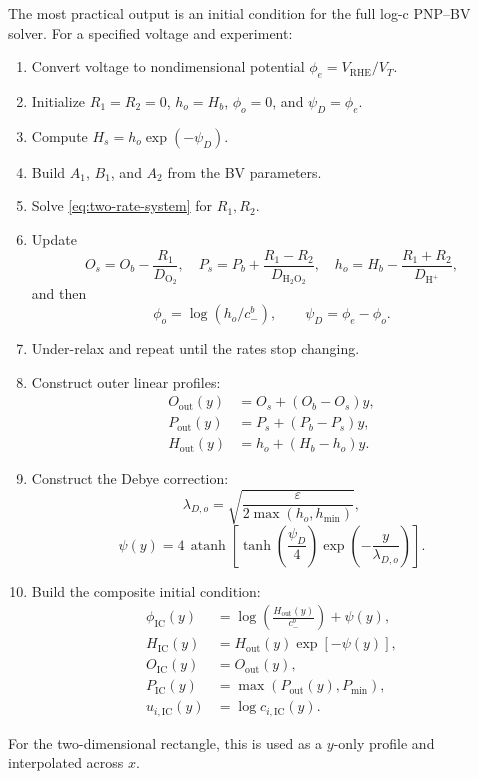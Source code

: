 \documentclass[11pt]{article}
\newcommand{\OO}{\mathrm{O}_2}
\newcommand{\PP}{\mathrm{H}_2\mathrm{O}_2}
\newcommand{\HH}{\mathrm{H}^{+}}
\newcommand{\VT}{V_T}
\newcommand{\epshat}{\varepsilon}
\begin{document}
The most practical output is an initial condition for the full log-c PNP--BV
solver. For a specified voltage and experiment:
\begin{enumerate}
  \item Convert voltage to nondimensional potential
        \(\phi_e=V_{\mathrm{RHE}}/\VT\).
  \item Initialize \(R_1=R_2=0\), \(h_o=H_b\), \(\phi_o=0\), and
        \(\psi_D=\phi_e\).
  \item Compute \(H_s=h_o\exp(-\psi_D)\).
  \item Build \(A_1\), \(B_1\), and \(A_2\) from the BV parameters.
  \item Solve \eqref{eq:two-rate-system} for \(R_1,R_2\).
  \item Update
        \[
          O_s=O_b-\frac{R_1}{D_{\OO}},
          \quad
          P_s=P_b+\frac{R_1-R_2}{D_{\PP}},
          \quad
          h_o=H_b-\frac{R_1+R_2}{D_{\HH}},
        \]
        and then
        \[
          \phi_o=\log(h_o/c_-^b),
          \qquad
          \psi_D=\phi_e-\phi_o.
        \]
  \item Under-relax and repeat until the rates stop changing.
  \item Construct outer linear profiles:
        \begin{align}
          O_{\mathrm{out}}(y) &= O_s+(O_b-O_s)y, \\
          P_{\mathrm{out}}(y) &= P_s+(P_b-P_s)y, \\
          H_{\mathrm{out}}(y) &= h_o+(H_b-h_o)y.
        \end{align}
  \item Construct the Debye correction:
        \[
          \lambda_{D,o}=\sqrt{\frac{\epshat}{2\max(h_o,h_{\min})}},
        \]
        \[
          \psi(y)
          =
          4\,\operatorname{atanh}
          \left[
            \tanh\!\left(\frac{\psi_D}{4}\right)
            \exp\!\left(-\frac{y}{\lambda_{D,o}}\right)
          \right].
        \]
  \item Build the composite initial condition:
        \begin{align}
          \phi_{\mathrm{IC}}(y)
          &=
          \log\!\left(\frac{H_{\mathrm{out}}(y)}{c_-^b}\right)
          + \psi(y), \\
          H_{\mathrm{IC}}(y)
          &=
          H_{\mathrm{out}}(y)\exp[-\psi(y)], \\
          O_{\mathrm{IC}}(y)
          &=
          O_{\mathrm{out}}(y), \\
          P_{\mathrm{IC}}(y)
          &=
          \max(P_{\mathrm{out}}(y),P_{\min}), \\
          u_{i,\mathrm{IC}}(y)
          &=
          \log c_{i,\mathrm{IC}}(y).
        \end{align}
\end{enumerate}
For the two-dimensional rectangle, this is used as a \(y\)-only profile and
interpolated across \(x\).
\end{document}

